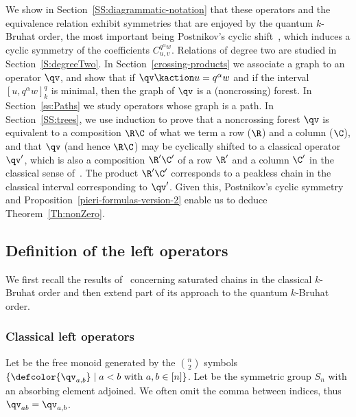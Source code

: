 We show in Section~\ref{SS:diagrammatic-notation} that these operators and the equivalence relation exhibit symmetries that
are enjoyed by the quantum $k$-Bruhat order, the most important being Postnikov's cyclic shift~\cite{Postnikov_symmetry},
which induces a cyclic symmetry of the coefficients $C^{q^\alpha w}_{u,v}$.
Relations of degree two are studied in Section~\ref{S:degreeTwo}.
In Section~\ref{crossing-products} we associate a graph to an operator $\qv$, and show that if
$\qv\kaction u=q^\alpha w$ and if the interval $[u,q^\alpha w]_k^q$ is minimal, then the graph of $\qv$ is a (noncrossing) forest.
In Section~\ref{ss:Paths} we study operators whose graph is a path.
In Section~\ref{SS:trees}, 
we use induction to prove that a noncrossing forest $\qv$ is equivalent to a composition $\R\C$ of what we term a row ($\R$) and
a column ($\C$), and that $\qv$ (and hence $\R\C$) may be cyclically shifted to a classical operator $\qv'$, which is also
a composition $\R'\C'$ of a row $\R'$ and a column $\C'$ in the classical sense of~\cite{Benedetti_Bergeron}.
The product $\R'\C'$ corresponds to a peakless chain in the classical interval corresponding to $\qv'$.
Given this, Postnikov's cyclic symmetry~\cite[Thm.~4]{Postnikov_symmetry} and
Proposition~\ref{pieri-formulas-version-2} enable us to deduce Theorem~\ref{Th:nonZero}.

\subsection{Definition of the left operators}
\label{SS:monoid}

We first recall the results of~\cite{BS-Monoid} concerning saturated chains in the classical $k$-Bruhat order
and then extend part of its approach to the quantum $k$-Bruhat order.

\subsubsection{Classical left operators}
\label{SS:classical-left-operators}

Let  be the free monoid generated by the $\binom{n}{2}$ symbols
$\{\defcolor{\qv_{a,b}} \mid a<b \mbox{ with }a,b\in[n]\}$.
Let  be the symmetric group $S_n$ with an
absorbing element  adjoined.
We often omit the comma between indices, thus
$\qv_{ab}=\qv_{a,b}$.

